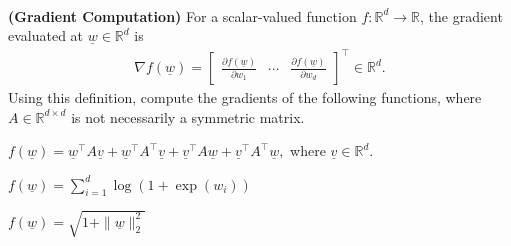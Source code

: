 \documentclass{article}
\title{\vspace{-2.5cm}\textbf{\coursefullname}\\\hatypeandnun\\\haname}
\date{}
\theoremstyle{definition}
\begin{document}
\maketitle
\vspace*{-2cm}
\begin{question}
	\item \textbf{(Gradient Computation)} For a scalar-valued function $f : \mathbb{R}^d \to \mathbb{R}$, the gradient evaluated at $\underline{w} \in \mathbb{R}^d$ is
	\begin{align*}
		\nabla f(\underline{w}) = \begin{bmatrix}
			\frac{\partial f(\underline{w})}{\partial w_1} & \cdots & \frac{\partial f(\underline{w})}{\partial w_d}
		\end{bmatrix}^\top \in \mathbb{R}^d.
	\end{align*}
	Using this definition, compute the gradients of the following functions, where $A \in \mathbb{R}^{d \times d}$ is not necessarily a symmetric matrix.
	\begin{question}
		\item $f(\underline{w}) = \underline{w}^\top A \underline{v} + \underline{w}^\top A^\top \underline{v} + \underline{v}^\top A \underline{w} + \underline{v}^\top A^\top \underline{w},$ where $\underline{v} \in \mathbb{R}^d$.
		\item $f(\underline{w}) = \sum_{i=1}^d \log(1 + \exp(w_i))$
		\item $f(\underline{w}) = \sqrt{1 + \|\underline{w}\|_2^2}$
	\end{question}
	

\end{question}
\end{document}
